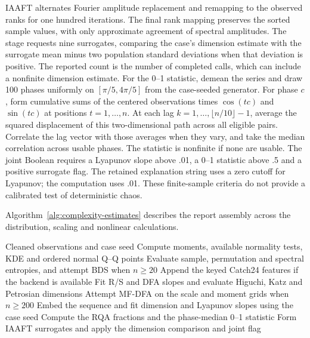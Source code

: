 IAAFT alternates Fourier amplitude replacement and remapping to the observed ranks for one hundred iterations. The final rank mapping preserves the sorted sample values, with only approximate agreement of spectral amplitudes. The stage requests nine surrogates, comparing the case's dimension estimate with the surrogate mean minus two population standard deviations when that deviation is positive. The reported count is the number of completed calls, which can include a nonfinite dimension estimate. For the 0--1 statistic, demean the series and draw 100 phases uniformly on $[\pi/5,4\pi/5]$ from the case-seeded generator. For phase $c$, form cumulative sums of the centered observations times $\cos(tc)$ and $\sin(tc)$ at positions $t=1,\ldots,n$. At each lag $k=1,\ldots,\lfloor n/10\rfloor-1$, average the squared displacement of this two-dimensional path across all eligible pairs. Correlate the lag vector with those averages when they vary, and take the median correlation across usable phases. The statistic is nonfinite if none are usable. The joint Boolean requires a Lyapunov slope above .01, a 0--1 statistic above .5 and a positive surrogate flag. The retained explanation string uses a zero cutoff for Lyapunov; the computation uses .01. These finite-sample criteria do not provide a calibrated test of deterministic chaos.

Algorithm~\ref{alg:complexity-estimates} describes the report
assembly across the distribution, scaling and nonlinear calculations.
\begin{algorithm}[htbp]
\caption{Compute distribution, scaling and nonlinear diagnostics while retaining unavailable branches and finite-sample thresholds.}
\label{alg:complexity-estimates}
\begin{algorithmic}[1]
\Require Cleaned observations and case seed
\State Compute moments, available normality tests, KDE and ordered normal Q--Q points
\State Evaluate sample, permutation and spectral entropies, and attempt BDS when $n\ge20$
\State Append the keyed Catch24 features if the backend is available
\State Fit R/S and DFA slopes and evaluate Higuchi, Katz and Petrosian dimensions
\State Attempt MF-DFA on the scale and moment grids when $n\ge200$
  \State Embed the sequence and fit dimension and Lyapunov slopes using the case seed
  \State Compute the RQA fractions and the phase-median 0--1 statistic
  \State Form IAAFT surrogates and apply the dimension comparison and joint flag
\EndIf
\end{algorithmic}
\end{algorithm}

